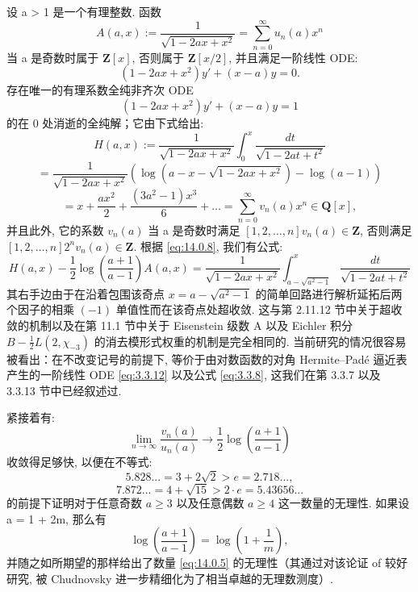 设 a > 1 是一个有理整数. 函数
\begin{equation}\label{eq:14.0.6}
A(a,x) := \frac{1}{\sqrt{1 - 2ax + x^2}} = \sum_{n=0}^{\infty} u_n(a)x^n
\end{equation}
当 a 是奇数时属于 \(\mathbf{Z}[x]\), 否则属于 \(\mathbf{Z}[x/2]\), 
并且满足一阶线性 ODE:
\begin{equation}\label{eq:14.0.7}
(1 - 2ax + x^2)y' + (x - a)y = 0.
\end{equation}
存在唯一的有理系数全纯非齐次 ODE
\[ (1 - 2ax + x^2)y' + (x - a)y = 1 \]
的在 0 处消逝的全纯解；它由下式给出:
\begin{equation}\label{eq:14.0.8}
H(a,x) := \frac{1}{\sqrt{1 - 2ax + x^2}} \int_0^x \frac{dt}{\sqrt{1 - 2at + t^2}}
\end{equation}
\[ = \frac{1}{\sqrt{1 - 2ax + x^2}} \left( \log\left(a - x - \sqrt{1 - 2ax + x^2}\right) - \log(a - 1) \right) \]
\[ = x + \frac{ax^2}{2} + \frac{(3a^2 - 1)x^3}{6} + \dots = \sum_{n=0}^{\infty} v_n(a)x^n \in \mathbf{Q}[x], \]
并且此外, 它的系数 \(v_n(a)\) 当 a 是奇数时满足 \([1, 2, \ldots, n]v_n(a) \in \mathbf{Z}\), 
否则满足 \([1, 2, \ldots, n]2^n v_n(a) \in \mathbf{Z}\). 
根据 \eqref{eq:14.0.8}, 我们有公式:
\[ H(a,x) - \frac{1}{2}\log\left(\frac{a+1}{a-1}\right)A(a,x) = \frac{1}{\sqrt{1-2ax+x^2}} \int_{a-\sqrt{a^2-1}}^{x} \frac{dt}{\sqrt{1-2at+t^2}} \]
其右手边由于在沿着包围该奇点 \(x=a-\sqrt{a^2-1}\) 
的简单回路进行解析延拓后两个因子的相乘 \((-1)\) 单值性而在该奇点处超收敛. 
这与第 2.11.12 节中关于超收敛的机制以及在第 11.1 节中关于 Eisenstein 级数 A 以及 Eichler 积分 \(B-\frac{1}{2}L(2,\chi_{-3})\) 的消去模形式权重的机制是完全相同的. 
当前研究的情况很容易被看出：在不改变记号的前提下, 
等价于由对数函数的对角 Hermite--Pad{\'e} 逼近表产生的一阶线性 ODE \eqref{eq:3.3.12} 以及公式 \eqref{eq:3.3.8}, 
这我们在第 3.3.7 以及 3.3.13 节中已经叙述过.

紧接着有:
\begin{equation}\label{eq:14.0.9}
\lim_{n \to \infty} \frac{v_n(a)}{u_n(a)} \to \frac{1}{2} \log \left( \frac{a+1}{a-1} \right)
\end{equation}
收敛得足够快, 以便在不等式:
\[ 5.828... = 3 + 2\sqrt{2} > e = 2.718..., \]
\[ 7.872... = 4 + \sqrt{15} > 2 \cdot e = 5.43656... \]
的前提下证明对于任意奇数 \(a \geq 3\) 以及任意偶数 \(a \geq 4\) 这一数量的无理性. 
如果设 a = 1 + 2m, 那么有
\[ \log\left(\frac{a+1}{a-1}\right) = \log\left(1 + \frac{1}{m}\right), \]
并随之如所期望的那样给出了数量 \eqref{eq:14.0.5} 的无理性（其通过对该论证 of 较好研究, 被 Chudnovsky \cite{Chu79}\cite{Chu83b} 进一步精细化为了相当卓越的无理数测度）.

